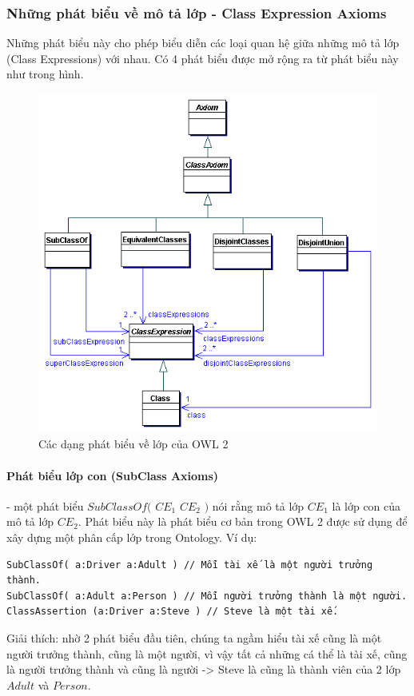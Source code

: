\subsubsection{Những phát biểu về mô tả lớp - Class Expression Axioms}
Những phát biểu này cho phép biểu diễn các loại quan hệ giữa những mô tả lớp (Class Expressions) với nhau. Có 4 phát biểu được mở rộng ra từ phát biểu này như trong hình.
\begin{figure}[h]
	\centering
	\includegraphics[width=120mm]{Figures/classAxiom.png}
	\caption{Các dạng phát biểu về lớp của OWL 2\label{overflow}}
\end{figure}

\paragraph{Phát biểu lớp con (SubClass Axioms)} - một phát biểu $SubClassOf($ $CE_{1}$ $CE_{2}$ $)$ nói rằng mô tả lớp $CE_{1}$ là lớp con của mô tả lớp $CE_{2}$. Phát biểu này là phát biểu cơ bản trong OWL 2 được sử dụng để xây dựng một phân cấp lớp trong Ontology. Ví dụ:
\begin{verbatim}
SubClassOf( a:Driver a:Adult ) // Mỗi tài xế là một người trưởng thành.
SubClassOf( a:Adult a:Person ) // Mỗi người trưởng thành là một người.
ClassAssertion (a:Driver a:Steve ) // Steve là một tài xế.
\end{verbatim}
Giải thích: nhờ 2 phát biểu đầu tiên, chúng ta ngầm hiểu tài xế cũng là một người trưởng thành, cũng là một người, vì vậy tất cả những cá thể là tài xế, cũng là người trưởng thành và cũng là người -> Steve là cũng là thành viên của 2 lớp $Adult$ và $Person$.

